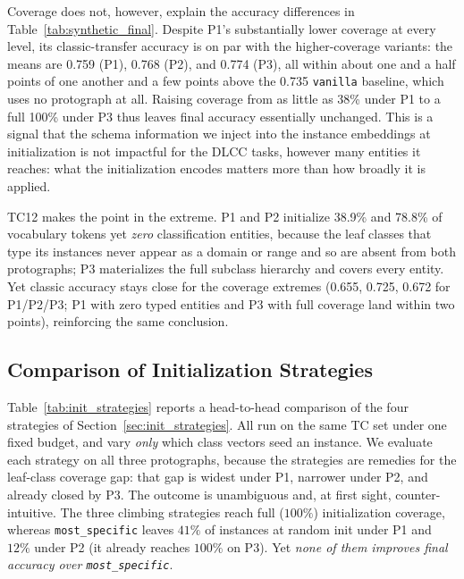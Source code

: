 \documentclass[a4paper,oneside,bibliography=totoc]{scrbook}
\begin{document}
Coverage does not, however, explain the accuracy differences in
Table~\ref{tab:synthetic_final}. Despite P1's substantially lower coverage at every
level, its classic-transfer accuracy is on par with the higher-coverage variants:
the means are 0.759 (P1), 0.768 (P2), and 0.774 (P3), all within about one and a
half points of one another and a few points above the 0.735 \texttt{vanilla} baseline, which uses no
protograph at all. Raising coverage from as little as 38\% under P1 to a full 100\%
under P3 thus leaves final accuracy essentially unchanged. This is a signal that the
schema information we inject into the instance embeddings at initialization is not
impactful for the DLCC tasks, however many entities it reaches: what the
initialization encodes matters more than how broadly it is applied.

TC12 makes the point in the extreme. P1 and P2 initialize 38.9\% and 78.8\% of
vocabulary tokens yet \emph{zero} classification entities, because the leaf classes
that type its instances never appear as a domain or range and so are absent from both
protographs; P3 materializes the full subclass hierarchy and covers every entity. Yet
classic accuracy stays close for the coverage extremes (0.655, 0.725, 0.672 for P1/P2/P3;
P1 with zero typed entities and P3 with full coverage land within two points), reinforcing the same
conclusion.

\subsection{Comparison of Initialization Strategies}
\label{sec:results_init_strategies}

Table~\ref{tab:init_strategies} reports a head-to-head comparison of the four
strategies of Section~\ref{sec:init_strategies}. All run on the same TC set under
one fixed budget, and vary \emph{only} which class vectors seed an instance. We
evaluate each strategy on all three protographs, because the strategies are
remedies for the leaf-class coverage gap: that gap is widest under P1, narrower
under P2, and already closed by P3. The outcome is unambiguous and, at first
sight, counter-intuitive. The three climbing strategies reach full ($100\%$)
initialization coverage, whereas \texttt{most\_specific} leaves $41\%$ of
instances at random init under P1 and $12\%$ under P2 (it already reaches $100\%$
on P3). Yet \emph{none of them improves final accuracy over
\texttt{most\_specific}}.
\end{document}
